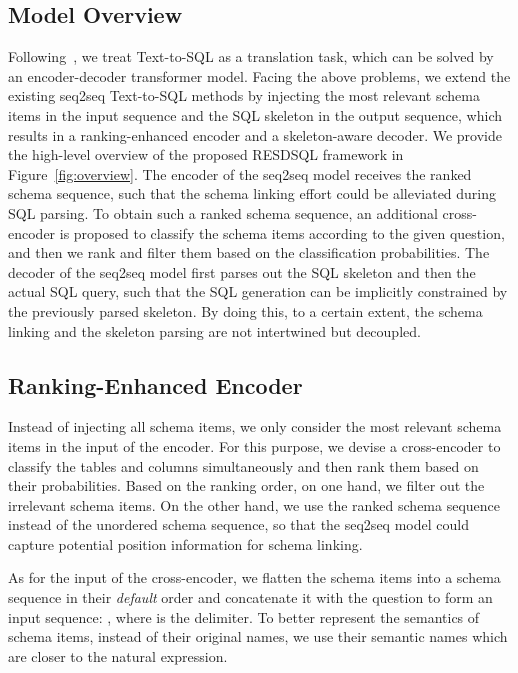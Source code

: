 \documentclass[letterpaper]{article} \usepackage{aaai23}  \usepackage{times}  \usepackage{helvet}  \usepackage{courier}  \usepackage[hyphens]{url}  \usepackage{graphicx} \urlstyle{rm} \def\UrlFont{\rm}  \usepackage{natbib}  \usepackage{caption} \frenchspacing  \setlength{\pdfpagewidth}{8.5in}  \setlength{\pdfpageheight}{11in}  \usepackage{algorithm}
\newcommand{\smodel}{RESDSQL }
\begin{document}
\subsection{Model Overview}
Following~\citet{peter2021compositional, torsten2021picard}, we treat Text-to-SQL as a translation task, which can be solved by an encoder-decoder transformer model. 
Facing the above problems, we extend the existing seq2seq Text-to-SQL methods by injecting the most relevant schema items in the input sequence and the SQL skeleton in the output sequence, which results in a ranking-enhanced encoder and a skeleton-aware decoder.
We provide the high-level overview of the proposed \smodel framework in Figure~\ref{fig:overview}. The encoder of the seq2seq model receives the ranked schema sequence, such that the schema linking effort could be alleviated during SQL parsing. To obtain such a ranked schema sequence, an additional cross-encoder is proposed to classify the schema items according to the given question, and then we rank and filter them based on the classification probabilities. The decoder of the seq2seq model first parses out the SQL skeleton and then the actual SQL query, such that the SQL generation can be implicitly constrained by the previously parsed skeleton. By doing this, to a certain extent, the schema linking and the skeleton parsing are not intertwined but decoupled.

\subsection{Ranking-Enhanced Encoder}
Instead of injecting all schema items, we only consider the most relevant schema items in the input of the encoder. 
For this purpose, we devise a cross-encoder to classify the tables and columns simultaneously and then rank them based on their probabilities. Based on the ranking order, on one hand, we filter out the irrelevant schema items. On the other hand, we use the ranked schema sequence instead of the unordered schema sequence, so that the seq2seq model could capture potential position information for schema linking. 

As for the input of the cross-encoder, we flatten the schema items into a schema sequence in their \textit{default} order and concatenate it with the question to form an input sequence: 
, where  is the delimiter. To better represent the semantics of schema items, instead of their original names, we use their semantic names which are closer to the natural expression.
\end{document}
